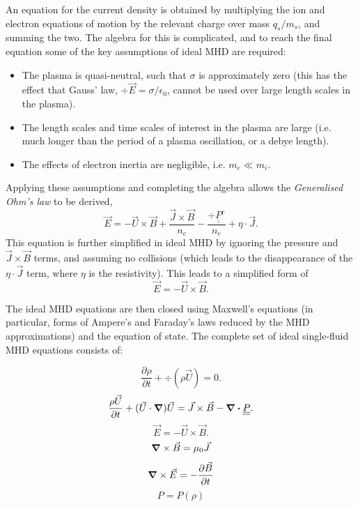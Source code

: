 An equation for the current density is obtained by multiplying the ion and electron equations of motion by the relevant charge over mass $q_s/m_s$, and summing the two. The algebra for this is complicated, and to reach the final equation some of the key assumptions of ideal MHD are required:
\begin{itemize}
	\item{The plasma is quasi-neutral, such that $\sigma$ is approximately zero (this has the effect that Gauss' law, $\div \vec{E} = \sigma / \epsilon_0$, cannot be used over large length scales in the plasma).}
	\item{The length scales and time scales of interest in the plasma are large (i.e. much longer than the period of a plasma oscillation, or a debye length).}
	\item{The effects of electron inertia are negligible, i.e. $m_e \ll m_i$.}
\end{itemize}
Applying these assumptions and completing the algebra allows the \textit{Generalised Ohm's law} to be derived, 
\begin{equation} \vec{E} = -\vec{U}\times\vec{B} + \frac{\vec{J} \times \vec{B}}{n_e} - \frac{\div \underline{\underline{P}}^e}{n_e} + \eta \cdot \vec{J}. \end{equation}
This equation is further simplified in ideal MHD by ignoring the pressure and $\vec{J} \times \vec{B}$ terms, and assuming no collisions (which leads to the disappearance of the $\eta \cdot \vec{J}$ term, where $\eta$ is the resistivity). This leads to a simplified form of 
\begin{equation} \vec{E} = -\vec{U}\times\vec{B} . \end{equation}

The ideal MHD equations are then closed using Maxwell's equations (in particular, forms of Ampere's and Faraday's laws reduced by the MHD approximations) and the equation of state. The complete set of ideal single-fluid MHD equations consists of:

\begin{equation} \frac{\partial \rho}{\partial t} + \div (\rho \vec{U}) = 0. \end{equation}
\begin{equation} \frac{\rho \vec{U}}{\partial t} + (\vec{U} \cdot \grad)\vec{U} =\vec{J} \times \vec{B} - \div \underline{\underline{P}} .\end{equation}
\begin{equation} \vec{E} = -\vec{U}\times\vec{B} . \end{equation}
\begin{equation} \grad \times \vec{B} = \mu_0 \vec{J} \end{equation}
\begin{equation} \grad \times \vec{E} = - \frac{\partial \vec{B}}{\partial t} \end{equation}
\begin{equation} P = P(\rho)  \end{equation}


